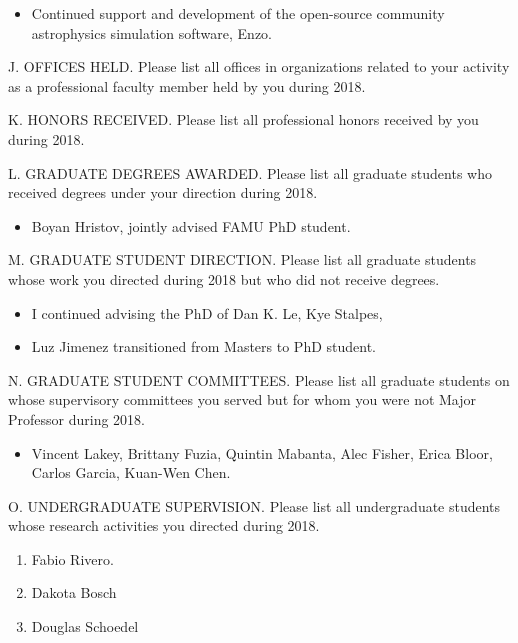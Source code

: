 \begin{itemize}
    \item Continued support and development of the open-source community
        astrophysics simulation software, Enzo.  
\end{itemize}

\noindent J. OFFICES HELD. Please list all offices in organizations
related to your activity as a professional faculty member held by
you during 2018.
\bigskip

\noindent K. HONORS RECEIVED. Please list all professional honors
received by you during 2018.
\bigskip

\noindent L. GRADUATE DEGREES AWARDED. Please list all graduate
students who received degrees under your direction during 2018.
\bigskip

\begin{itemize}
    \item Boyan Hristov, jointly advised FAMU PhD student.
\end{itemize}

\noindent M. GRADUATE STUDENT DIRECTION. Please list all graduate
students whose work you directed during 2018 but who did not receive
degrees.

\begin{itemize}
    \item I continued advising the PhD of Dan K. Le, Kye Stalpes, 
    \item Luz Jimenez transitioned from Masters to PhD student.
\end{itemize}

\noindent N. GRADUATE STUDENT COMMITTEES. Please list all graduate
students on whose supervisory committees you served but for whom you
were not Major Professor during 2018.

\begin{itemize}
    \item Vincent Lakey, Brittany Fuzia, Quintin Mabanta, Alec Fisher, Erica
Bloor, Carlos Garcia, Kuan-Wen Chen.
\end{itemize}

\noindent O. UNDERGRADUATE SUPERVISION. Please list all
undergraduate students whose research activities you directed during
2018.

\begin{enumerate}
    \item Fabio Rivero.
    \item Dakota Bosch
    \item Douglas Schoedel
\end{enumerate}

